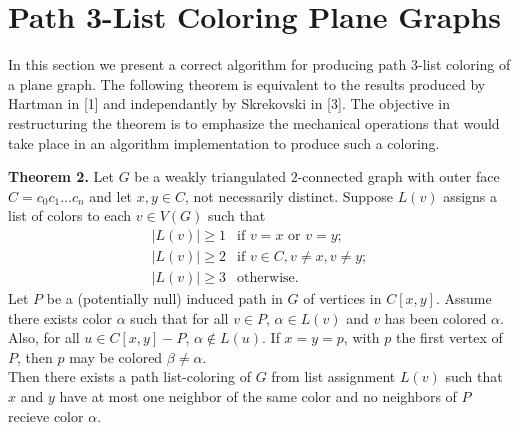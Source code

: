 \documentclass[11pt,letter]{article}
\begin{document}
\begin{comment}
  \node (1c2) at (1cm,1.25cm) {$c_2$};
  \node (1c3) at (2.25cm,1cm) {$c_3$};
  
  \node (c3) at (3.25cm,1cm) {$c_3$};
  \node (c4) at (4cm,0cm) {$c_4$};
  \node (c5) at (3.25cm,-1cm) {$c_5$};
  \node (c6) at (2cm,-1.25cm) {$c_6$};
  
  \node (2c6) at (1cm,-1.25cm) {$c_6$};
  \node (2c7) at (-0.25cm,-1cm) {$c_7$};
  
  \draw (0c1) -- (0c2); \draw (1c2) -- (1c3); \draw (c3) -- (c4) -- (c5) -- (c6) -- (c3);
  \draw (2c6) -- (2c7); \draw (c3)-- (c5) [dashed];
\end{tikzpicture}
\hfill\\
\hfill\\
\footnotesize{Removing $c_0$ and disecting into blocks with Theorem 2.}
\end{center}
\end{adjustwidth}
\hfill

\noindent Note that when applying Theorem 2, $G-c_0$ is $2$-connected
(i.e. $G-c_0=G_0$) if and only if Theorem 1 applies.

\end{comment}

\section*{Path 3-List Coloring Plane Graphs}

In this section we present a correct algorithm for producing path $3$-list coloring of a plane graph. The following
theorem is equivalent to the results produced by Hartman in [1] and independantly by Skrekovski in [3]. The objective in restructuring
the theorem is to emphasize the mechanical operations that would take place in an algorithm implementation
to produce such a coloring.\\

\begin{adjustwidth}{2em}{2em}
\noindent\textbf{Theorem 2.} Let $G$ be a weakly triangulated $2$-connected graph with outer face $C=c_0c_1\ldots c_{n}$
and let $x,y\in C$, not necessarily distinct.
Suppose $L(v)$ assigns a list of colors to each $v\in V(G)$ such that
\[
    \begin{array}{ll}
	    |L(v)|\ge 1 & \text{if } v=x \text{ or } v=y;\\
	    |L(v)|\ge 2 & \text{if } v\in C, v\ne x, v\ne y;\\
	    |L(v)|\ge 3 & \text{otherwise.}
    \end{array}
\]
Let $P$ be a (potentially null) induced path in $G$ of vertices in $C[x,y]$. Assume
there exists color $\alpha$ such that for all $v\in P$, $\alpha\in L(v)$ and $v$ has been colored $\alpha$. Also,
for all $u\in C[x,y]-P$, $\alpha\not\in L(u)$. If $x=y=p$, with $p$ the first vertex of $P$,
then $p$ may be colored $\beta\ne\alpha$.\\

\noindent Then there exists a path list-coloring of $G$ from list assignment $L(v)$ such that $x$ and $y$ have
at most one neighbor of the same color and no neighbors of $P$ recieve color $\alpha$.\\
\end{adjustwidth}
\end{document}
